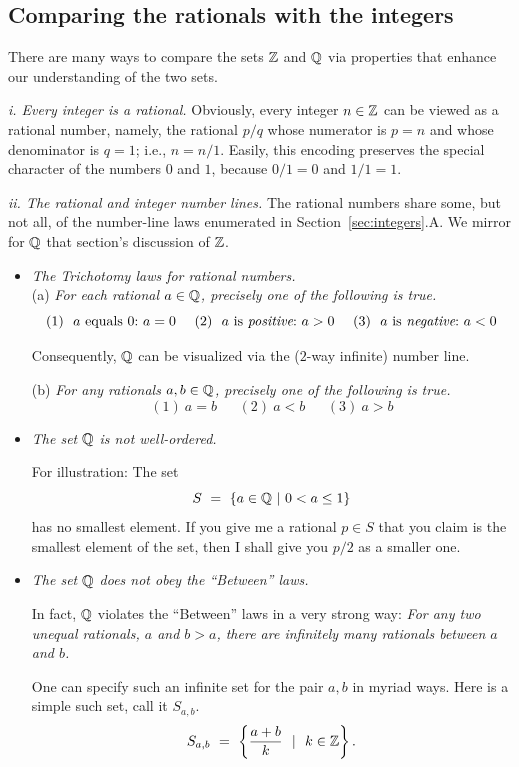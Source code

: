 \subsection{Comparing the rationals with the integers}

There are many ways to compare the sets $\mathbb{Z}$ and $\mathbb{Q}$ via properties
that enhance our understanding of the two sets.

\medskip

{\it i. Every integer is a rational.}
%
Obviously, every integer $n \in \mathbb{Z}$ can be viewed as a rational
number, namely, the rational $p/q$ whose numerator is $p = n$ and
whose denominator is $q = 1$; i.e., $n = n/1$.  Easily, this encoding
preserves the special character of the numbers $0$ and $1$, because
$0/1 = 0$ and $1/1 = 1$.

\medskip

{\it ii. The rational and integer number lines.}
%
The rational numbers share some, but not all, of the number-line laws
enumerated in Section~\ref{sec:integers}.A.  We mirror for $\mathbb{Q}$ that
section's discussion of $\mathbb{Z}$.
\begin{itemize}
\item
{\it The Trichotomy laws for rational numbers.} \\
(a)
%
{\it For each rational $a \in \mathbb{Q}$, precisely one of the following is true.}
\[
(1) \ \mbox{ $a$ equals $0$:} \ a=0 \ \ \ \
(2) \ \mbox{ $a$ is {\em positive}:} \ a>0 \ \ \ \
(3) \ \mbox{ $a$ is {\em negative}:} \ a<0
\]

Consequently, $\mathbb{Q}$ can be visualized via the ($2$-way infinite) number
line.

\medskip

(b)
%
{\it For any rationals $a, b \in \mathbb{Q}$, precisely one of the following is
  true.}
\[ (1) \ a=b \ \ \ \ \ \ \ (2) \ a<b \ \ \ \ \ \ \ (3) \ a>b \]

\item
{\em The set $\mathbb{Q}$ is {\em not} well-ordered.}

For illustration:  The set
\[ S \ = \ \{ a \in \mathbb{Q}  \ |\ 0 < a \leq 1 \} \]
has no smallest element.  If you give me a rational $p \in S$ that you
claim is the smallest element of the set, then I shall give you $p/2$
as a smaller one.

\medskip

\item
{\em The set $\mathbb{Q}$ does {\em not} obey the ``Between'' laws.}

In fact, $\mathbb{Q}$ violates the ``Between'' laws in a very strong way:
{\it For any two unequal rationals, $a$ and $b>a$, there are
  infinitely many rationals between $a$ and $b$.}

One can specify such an infinite set for the pair $a,b$ in myriad
ways.  Here is a simple such set, call it $S_{a,b}$.
\begin{equation}
\label{eq:between-rationals}
S_{a,b} \ = \ \left\{ \frac{a+b}{k} \ \ | \ \ k \in \mathbb{Z} \right\}.
\end{equation}
\end{itemize}

